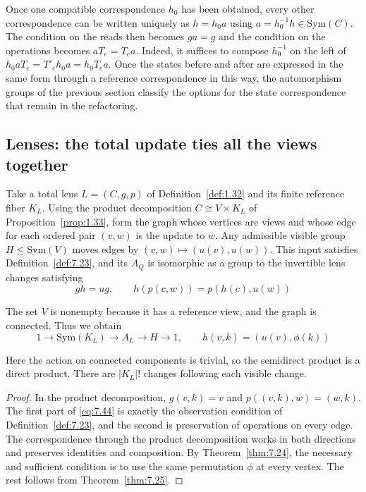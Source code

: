Once one compatible correspondence $h_0$ has been obtained, every other correspondence can
be written uniquely as $h=h_0a$ using $a=h_0^{-1}h\in\mathrm{Sym}(C)$.
The condition on the reads then becomes $ga=g$ and the condition on the operations becomes
$aT_e=T_ea$.
Indeed, it suffices to compose $h_0^{-1}$ on the left of $h_0aT_e=T'_eh_0a=h_0T_ea$.
Once the states before and after are expressed in the same form through a reference
correspondence in this way, the automorphism groups of the previous section classify the
options for the state correspondence that remain in the refactoring.

\subsection*{Lenses: the total update ties all the views together}

\begin{proposition}\label{prop:7.27}

Take a total lens $L=(C,g,p)$ of Definition~\ref{def:1.32} and its finite
reference fiber $K_L$. Using the product decomposition $C\cong V\times K_L$
of Proposition~\ref{prop:1.33}, form the graph whose vertices are views and whose
edge for each ordered pair $(v,w)$ is the update to $w$.
Any admissible visible group $H\le\mathrm{Sym}(V)$ moves edges by
$(v,w)\mapsto(u(v),u(w))$. This input satisfies Definition~\ref{def:7.23},
and its $A_Q$ is isomorphic as a group to the invertible lens changes satisfying
\begin{equation*}
gh=ug,\qquad h(p(c,w))=p(h(c),u(w))
\tag{7.44}\label{eq:7.44}
\end{equation*}

The set $V$ is nonempty because it has a reference view, and the graph is connected.
Thus we obtain
\begin{equation*}
1\longrightarrow\mathrm{Sym}(K_L)\longrightarrow A_L
\longrightarrow H\longrightarrow1,
\qquad
h(v,k)=(u(v),\phi(k))
\tag{7.45}\label{eq:7.45}
\end{equation*}

Here the action on connected components is trivial, so the semidirect product
is a direct product. There are $|K_L|!$ changes following each visible change.

\end{proposition}

\begin{proof}

In the product decomposition, $g(v,k)=v$ and $p((v,k),w)=(w,k)$.
The first part of \eqref{eq:7.44} is exactly the observation condition of
Definition~\ref{def:7.23}, and the second is preservation of operations on every edge.
The correspondence through the product decomposition works in both directions
and preserves identities and composition.
By Theorem~\ref{thm:7.24}, the necessary and sufficient condition is to use the
same permutation $\phi$ at every vertex.
The rest follows from Theorem~\ref{thm:7.25}.

\end{proof}

